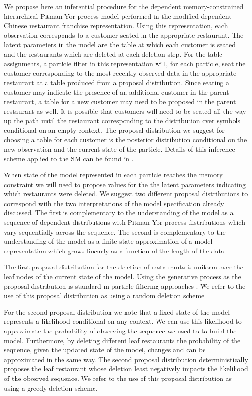 We propose here an inferential procedure for the dependent memory-constrained hierarchical Pitman-Yor process model performed in the modified dependent Chinese restaurant franchise representation.  Using this representation, each observation corresponds to a customer seated in the appropriate restaurant.  The latent parameters in the model are the table at which each customer is seated and the restaurants which are deleted at each deletion step.  For the table assignments, a particle filter in this representation will, for each particle, seat the customer corresponding to the most recently observed data in the appropriate restaurant at a table produced from a proposal distribution.  Since seating a customer may indicate the presence of an additional customer in the parent restaurant, a table for a new customer may need to be proposed in the parent restaurant as well.  It is possible that customers will need to be seated all the way up the path until the restaurant corresponding to the distribution over symbols conditional on an empty context.  The proposal distribution we suggest for choosing a table for each customer is the posterior distribution conditional on the new observation and the current state of the particle.  Details of this inference scheme applied to the SM can be found in \cite{Gasthaus2010}.

When state of the model represented in each particle reaches the memory constraint we will need to propose values for the the latent parameters indicating which restaurants were deleted. We suggest two different proposal distributions to correspond with the two interpretations of the model specification already discussed.  The first is complementary to the understanding of the model as a sequence of dependent distributions with Pitman-Yor process distributions which vary sequentially across the sequence.  The second is complementary to the understanding of the model as a finite state approximation of a model representation which grows linearly as a function of the length of the data.

The first proposal distribution for the deletion of restaurants is uniform over the leaf nodes of the current state of the model.  Using the generative process as the proposal distribution is standard in particle filtering approaches \cite{Doucet2001}.  We refer to the use of this proposal distribution as using a random deletion scheme.

For the second proposal distribution we note that a fixed state of the model represents a likelihood conditional on any context.  We can use this likelihood to approximate the probability of observing the sequence we used to to build the model.  Furthermore, by deleting different leaf restaurants the probability of the sequence, given the updated state of the model, changes and can be approximated in the same way.  The second proposal distribution deterministically proposes the leaf restaurant whose deletion least negatively impacts the likelihood of the observed sequence.  We refer to the use of this proposal distribution as using a greedy deletion scheme. 

